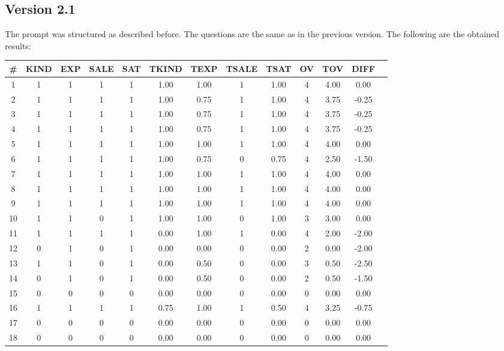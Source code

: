 \subsection{Version 2.1}
The prompt was structured as described before. The questions are the same as in the previous version. The following are the obtained results:
\begin{center}
      \begin{tabular}{ccccccccccccc}
            \toprule
            \# & KIND & EXP & SALE & SAT & TKIND & TEXP & TSALE & TSAT & OV & TOV  & DIFF  \\

            \midrule
            1  & 1    & 1   & 1    & 1   & 1.00  & 1.00 & 1     & 1.00 & 4  & 4.00 & 0.00  \\
            2  & 1    & 1   & 1    & 1   & 1.00  & 0.75 & 1     & 1.00 & 4  & 3.75 & -0.25 \\
            3  & 1    & 1   & 1    & 1   & 1.00  & 0.75 & 1     & 1.00 & 4  & 3.75 & -0.25 \\
            4  & 1    & 1   & 1    & 1   & 1.00  & 0.75 & 1     & 1.00 & 4  & 3.75 & -0.25 \\
            5  & 1    & 1   & 1    & 1   & 1.00  & 1.00 & 1     & 1.00 & 4  & 4.00 & 0.00  \\
            6  & 1    & 1   & 1    & 1   & 1.00  & 0.75 & 0     & 0.75 & 4  & 2.50 & -1.50 \\
            7  & 1    & 1   & 1    & 1   & 1.00  & 1.00 & 1     & 1.00 & 4  & 4.00 & 0.00  \\
            8  & 1    & 1   & 1    & 1   & 1.00  & 1.00 & 1     & 1.00 & 4  & 4.00 & 0.00  \\
            9  & 1    & 1   & 1    & 1   & 1.00  & 1.00 & 1     & 1.00 & 4  & 4.00 & 0.00  \\
            10 & 1    & 1   & 0    & 1   & 1.00  & 1.00 & 0     & 1.00 & 3  & 3.00 & 0.00  \\
            11 & 1    & 1   & 1    & 1   & 0.00  & 1.00 & 1     & 0.00 & 4  & 2.00 & -2.00 \\
            12 & 0    & 1   & 0    & 1   & 0.00  & 0.00 & 0     & 0.00 & 2  & 0.00 & -2.00 \\
            13 & 1    & 1   & 0    & 1   & 0.00  & 0.50 & 0     & 0.00 & 3  & 0.50 & -2.50 \\
            14 & 0    & 1   & 0    & 1   & 0.00  & 0.50 & 0     & 0.00 & 2  & 0.50 & -1.50 \\
            15 & 0    & 0   & 0    & 0   & 0.00  & 0.00 & 0     & 0.00 & 0  & 0.00 & 0.00  \\
            16 & 1    & 1   & 1    & 1   & 0.75  & 1.00 & 1     & 0.50 & 4  & 3.25 & -0.75 \\
            17 & 0    & 0   & 0    & 0   & 0.00  & 0.00 & 0     & 0.00 & 0  & 0.00 & 0.00  \\
            18 & 0    & 0   & 0    & 0   & 0.00  & 0.00 & 0     & 0.00 & 0  & 0.00 & 0.00  \\
            \bottomrule
      \end{tabular}
\end{center}

